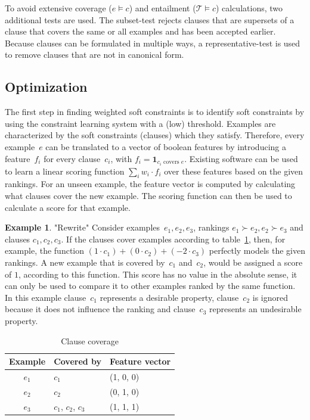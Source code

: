 \documentclass[letterpaper]{article}
\newcommand{\sym}[1]{\ensuremath{\mathcal{#1}}}
\theoremstyle{definition}
\newtheorem{example}{Example}
\begin{document}
To avoid extensive coverage ($e \models c$) and entailment ($\sym{T} \models c$) calculations, two additional tests are used.
The subset-test rejects clauses that are supersets of a clause that covers the same or all examples and has been accepted earlier.
Because clauses can be formulated in multiple ways, a representative-test is used to remove clauses that are not in canonical form.


\subsection{Optimization}
The first step in finding weighted soft constraints is to identify soft constraints by using the constraint learning system with a (low) threshold.
Examples are characterized by the soft constraints (clauses) which they satisfy.
Therefore, every example~$e$ can be translated to a vector of boolean features by introducing a feature~$f_i$ for every clause~$c_i$, with $f_i = \mathbf{1}_{c_i \text{ covers } e}$.
Existing software can be used to learn a linear scoring function $\sum_i w_i \cdot f_i$ over these features based on the given rankings.
For an unseen example, the feature vector is computed by calculating what clauses cover the new example.
The scoring function can then be used to calculate a score for that example.

\begin{example} "Rewrite"
  Consider examples~$e_1, e_2, e_3$, rankings $e_1 \succ e_2, e_2 \succ e_3$ and clauses $c_1, c_2, c_3$.
  If the clauses cover examples according to table~\ref{tbl:cover_examples}, then, for example, the function $(1 \cdot c_1) + (0\cdot c_2) + (-2\cdot c_3)$ perfectly models the given rankings.
  A new example that is covered by~$c_1$ and~$c_2$, would be assigned a score of $1$, according to this function.
  This score has no value in the absolute sense, it can only be used to compare it to other examples ranked by the same function.
  In this example clause~$c_1$ represents a desirable property, clause~$c_2$ is ignored because it does not influence the ranking and clause~$c_3$ represents an undesirable property.

  \begin{table}
  \caption{Clause coverage}
  \label{tbl:cover_examples}
  \begin{tabularx}{\linewidth}{c|l|X}
    \textbf{Example} & \textbf{Covered by} & \textbf{Feature vector}\\
    \toprule
    $e_1$             & $c_1$               & (1, 0, 0) \\
    $e_2$             & $c_2$               & (0, 1, 0) \\
    $e_3$             & $c_1$, $c_2$, $c_3$ & (1, 1, 1) \\
  \end{tabularx}
  \end{table}
\end{example}
\end{document}

